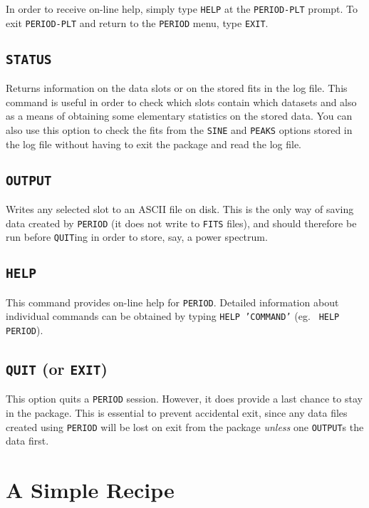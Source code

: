 In order
to receive on-line help, simply type {\tt HELP} at the {\tt PERIOD-PLT}
prompt. To exit {\tt PERIOD-PLT} and return to the {\tt PERIOD} menu,
type {\tt EXIT}.

\subsection*{\tt STATUS}

Returns information on the data slots or on the stored fits in the log file.
This command is useful in order to check which slots contain which datasets
and also as a means of obtaining some elementary statistics on the stored data. 
You can also use this option to check the fits from the {\tt SINE} and
{\tt PEAKS} options stored in the log file without having to exit the package 
and read the log file. 

\subsection*{\tt OUTPUT}

Writes any selected slot to an ASCII file on disk. This is the only way of
saving data created by {\tt PERIOD} (it does not write to {\tt FITS} files),
and should therefore be run before {\tt QUIT}ing in order to store, say, 
a power spectrum. 

\subsection*{\tt HELP}

This command provides on-line help for {\tt PERIOD}. Detailed information about
individual commands can be obtained by typing {\tt HELP 'COMMAND'} (eg. {\tt
HELP PERIOD}). 

\subsection*{{\tt QUIT} (or {\tt EXIT})}

This option quits a {\tt PERIOD} session. However, it does provide a last
chance to stay in the package. This is essential to prevent accidental exit,
since any data files created using {\tt PERIOD} will be lost on exit from the
package {\em unless} one {\tt OUTPUT}s the data first. 

\section{A Simple Recipe}
\label{recipe}

